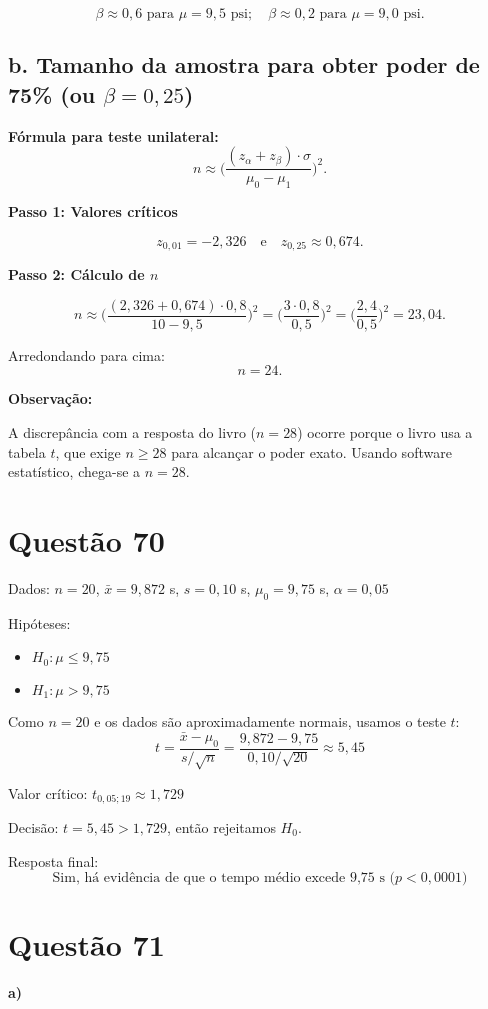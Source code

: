 \documentclass[12pt]{article}
\newcommand{\quest}[1]{\section*{Questão #1}} %
\begin{document}
\[
\beta \approx 0,6 \text{ para } \mu=9,5 \text{ psi}; 
\quad \beta \approx 0,2 \text{ para } \mu=9,0 \text{ psi}.
\]

\subsection*{b. Tamanho da amostra para obter poder de 75\% (ou \(\beta=0,25\))}

\textbf{Fórmula para teste unilateral:}
\[
n \approx \biggl(\frac{(z_\alpha + z_\beta) \cdot \sigma}{\mu_0 - \mu_1}\biggr)^2.
\]

\textbf{Passo 1: Valores críticos}

\[
z_{0,01} = -2,326 
\quad\text{e}\quad
z_{0,25} \approx 0,674.
\]

\textbf{Passo 2: Cálculo de \(n\)}

\[
n \approx \biggl(\frac{(2,326+0,674) \cdot 0,8}{10 - 9,5}\biggr)^2 
= \biggl(\frac{3 \cdot 0,8}{0,5}\biggr)^2
= \biggl(\frac{2,4}{0,5}\biggr)^2
= 23,04.
\]

Arredondando para cima:
\[
n=24.
\]

\textbf{Observação:}

A discrepância com a resposta do livro (\(n=28\)) ocorre porque o livro usa a tabela \(t\), que exige \(n \geq 28\) para alcançar o poder exato. Usando software estatístico, chega-se a \(n=28\).

\quest{70}

Dados: $n = 20$, $\bar{x} = 9{,}872$ s, $s = 0{,}10$ s, $\mu_0 = 9{,}75$ s, $\alpha = 0{,}05$

Hip\'oteses:
\begin{itemize}
  \item $H_0: \mu \leq 9{,}75$
  \item $H_1: \mu > 9{,}75$
\end{itemize}

Como $n = 20$ e os dados s\~ao aproximadamente normais, usamos o teste $t$:
\[
t = \frac{\bar{x} - \mu_0}{s / \sqrt{n}} = \frac{9{,}872 - 9{,}75}{0{,}10 / \sqrt{20}} \approx 5{,}45
\]

Valor cr\'itico: $t_{0{,}05; 19} \approx 1{,}729$

Decis\~ao: $t = 5{,}45 > 1{,}729$, ent\~ao rejeitamos $H_0$.

Resposta final:
\[
\boxed{\text{Sim, h\'a evid\^encia de que o tempo m\'edio excede 9{,}75 s ($p < 0{,}0001$)}}
\] 

\quest{71}

\textbf{a)}
\end{document}
